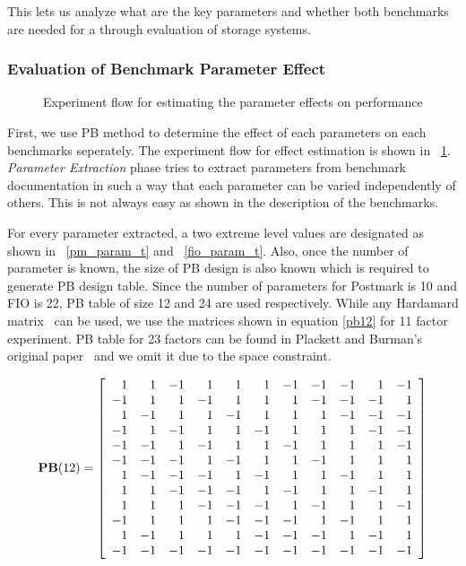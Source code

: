 This lets us analyze what are the key parameters and whether both benchmarks are needed for a through evaluation of storage systems.

\subsubsection{Evaluation of Benchmark Parameter Effect}

\begin{figure}
\centering

\caption{Experiment flow for estimating the parameter effects on performance}
\label{pb_flow_t}
\end{figure}

First, we use PB method to determine the effect of each parameters on each benchmarks seperately. 
The experiment flow for effect estimation is shown in \figurename~\ref{pb_flow_t}. 
\emph{Parameter Extraction} phase tries to extract parameters from benchmark documentation in such a way that each parameter can be varied independently of others. 
This is not always easy as shown in the description of the benchmarks. 

For every parameter extracted, a two extreme level values are designated as shown in \tablename~\ref{pm_param_t} and \tablename~\ref{fio_param_t}. 
Also, once the number of parameter is known, the size of PB design is also known which is required to generate PB design table.  
Since the number of parameters for Postmark is 10 and FIO is 22, PB table of size 12 and 24 are used respectively. 
While any Hardamard matrix~\cite{hadamar:1954} can be used, we use the matrices shown in equation \ref {pb12} for 11 factor experiment.  
PB table for 23 factors can be found in Plackett and Burman's original paper~\cite{plackett:1946} and we omit it due to the space constraint. 

\begin{equation}\label{pb12}
\mathbf{PB}(12)=
\left [ {\begin{array}{r r r r r r r r r r r}
  1&  1& -1&  1&  1&  1& -1& -1& -1&  1& -1\\
 -1&  1&  1& -1&  1&  1&  1& -1& -1& -1&  1\\
  1& -1&  1&  1& -1&  1&  1&  1& -1& -1& -1\\
 -1&  1& -1&  1&  1& -1&  1&  1&  1& -1& -1\\
 -1& -1&  1& -1&  1&  1& -1&  1&  1&  1& -1\\
 -1& -1& -1&  1& -1&  1&  1& -1&  1&  1&  1\\
  1& -1& -1& -1&  1& -1&  1&  1& -1&  1&  1\\
  1&  1& -1& -1& -1&  1& -1&  1&  1& -1&  1\\
  1&  1&  1& -1& -1& -1&  1& -1&  1&  1& -1\\
 -1&  1&  1&  1& -1& -1& -1&  1& -1&  1&  1\\
  1& -1&  1&  1&  1& -1& -1& -1&  1& -1&  1\\
 -1& -1& -1& -1& -1& -1& -1& -1& -1& -1& -1\\
\end{array}} \right ] 
\end{equation}

